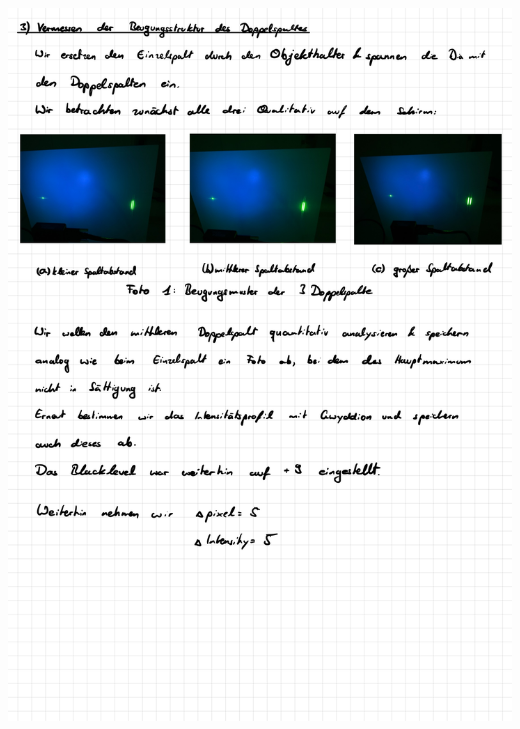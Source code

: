 \documentclass{article}
\begin{document}
\includegraphics[width=\textwidth]{graphics/messprotokoll/233 - Fourieroptik-8.jpg}
\newpage
\end{document}
